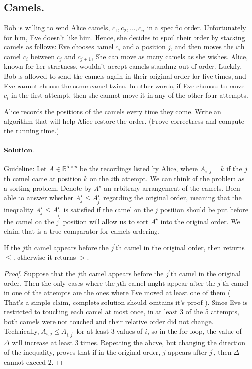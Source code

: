  \subsection{Camels.} 
 Bob is willing to send Alice camels, $c_1, c_2, ..., c_n$ in a specific order. Unfortunately for him, Eve doesn't like him. Hence, she decides to spoil their order by stacking camels as follows: Eve chooses camel $c_i$ and a position $j$, and then moves the $i$th camel $c_i$ between $c_j$ and $c_{j+1}$, She can move as many camels as she wishes. Alice, known for her strictness, wouldn't accept camels standing out of order. Luckily, Bob is allowed to send the camels again in their original order for five times, and Eve cannot choose the same camel twice. In other words, if Eve chooses to move $c_i$ in the first attempt, then she cannot move it in any of the other four attempts.

Alice records the positions of the camels every time they come. Write an algorithm that will help Alice restore the order. (Prove correctness and compute the running time.)
\ifdefined\SOLUTION
  \paragraph{Solution.} Guideline: Let $A \in \mathbb{R}^{5 \times n}$ be the recordings listed by Alice, where $A_{i,j} = k$ if the $j$th camel came at position $k$ on the $i$th attempt.  We can think of the problem as a sorting problem. Denote by $A^{\star}$ an arbitrary arrangement of the camels. Been able to answer whether $A^{\star}_{j} \le A^{\star}_{j^{\prime}}$ regarding the original order, meaning that the inequality $A^{\star}_{j} \le A^{\star}_{j^{\prime}}$ is satisfied if the camel on the $j$ position should be put before the camel on the $j^{\prime}$ position will allow us to sort $A^{\star}$ into the original order. We claim that  is a true comparator for camels ordering. 

  \begin{claim} 
If the $j$th camel appears before the $j^{\prime}$th camel in the original order, then  returns $\leq$, otherwise it returns $>$.
  \end{claim}
  \begin{proof}
    Suppose that the $j$th camel appears before the $j^{\prime}$th camel in the original order. Then the only cases where the $j$th camel might appear after the $j^{\prime}$th camel in one of the attempts are the ones where Eve moved at least one of them ( That's a simple claim, complete solution should contains it's proof ). Since Eve is restricted to touching each camel at most once, in at least 3 of the 5 attempts, both camels were not touched and their relative order did not change. Technically, $A_{i,j} \le A_{i,j^{\prime}}$ for at least 3 values of $i$, so in the for loop, the value of $\Delta$ will increase at least 3 times. Repeating the above, but changing the direction of the inequality, proves that if in the original order, $j$ appears after $j^{\prime}$, then $\Delta$ cannot exceed $2$.
  \end{proof}

